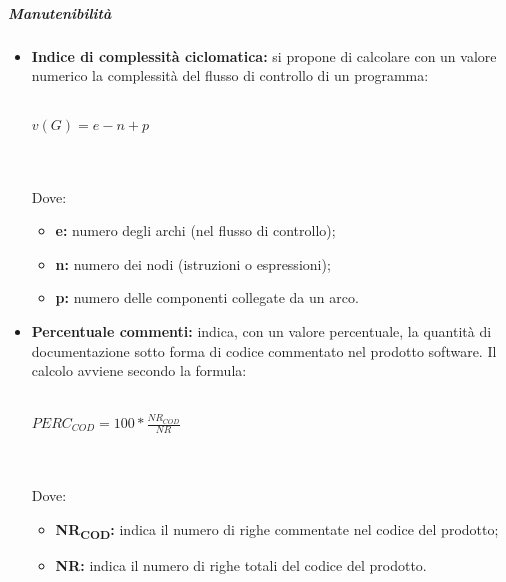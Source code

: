 \subparagraph*{Manutenibilità}
\begin{itemize}
	\item \textbf{Indice di complessità ciclomatica:} si propone di calcolare con un valore numerico la complessità del flusso di controllo di un programma:\\\\
	\centerline{
		\begin{math}
		v(G) = e-n+p
		\end{math}
	}
	\\\\Dove:
	\begin{itemize}
		\item \textbf{e:} numero degli archi (nel flusso di controllo);
		\item \textbf{n:} numero dei nodi (istruzioni o espressioni);
		\item \textbf{p:} numero delle componenti collegate da un arco.
	\end{itemize}
	\item \textbf{Percentuale commenti:} indica, con un valore percentuale, la quantità di documentazione sotto forma di codice commentato nel prodotto software. Il calcolo avviene secondo la formula:\\\\
	\centerline{
		\begin{math}
		PERC_{COD}=100*\frac{NR_{COD}}{NR}
		\end{math}
	}
	\\\\Dove:
	\begin{itemize}
		\item \textbf{NR\textsubscript{COD}:} indica il numero di righe commentate nel codice del prodotto;
		\item \textbf{NR:} indica il numero di righe totali del codice del prodotto.
	\end{itemize}
\end{itemize}
